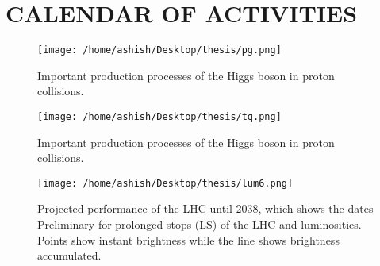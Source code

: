 \documentclass[final,3p]{CSP}
\begin{document}
\section{CALENDAR OF ACTIVITIES}

\newpage
\cleanpage



\begin{figure}
  \centering
   \texttt{[image: /home/ashish/Desktop/thesis/pg.png]}
  \caption{Important production processes of the Higgs boson in proton collisions.}
   \label{figure 1}
\end{figure}

\begin{figure}
  \centering
   \texttt{[image: /home/ashish/Desktop/thesis/tq.png]}
  \caption{Important production processes of the Higgs boson in proton collisions.}
   \label{figure 2}
\end{figure}



\begin{figure}
  \centering
  \texttt{[image: /home/ashish/Desktop/thesis/lum6.png]}
  \caption{\onehalfspacing Projected performance of the LHC until 2038, which shows the dates
Preliminary for prolonged stops (LS) of the LHC and luminosities. Points
show instant brightness while the line shows brightness accumulated.}
   \label{figure 4}
\end{figure}



\end{document}
